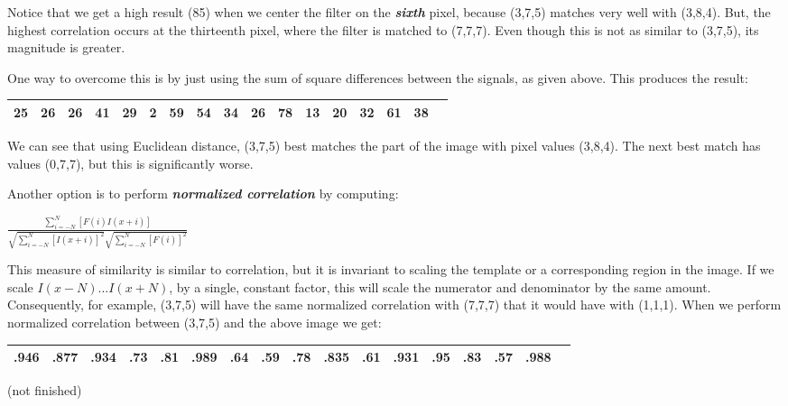 \documentclass{report}
\begin{document}
Notice that we get a high result (85) when we center the filter on the \textbf{\textit{sixth}} pixel, because (3,7,5) matches very well with (3,8,4). But, the highest correlation occurs at the thirteenth pixel, where the filter is matched to (7,7,7). Even though this is not as similar to (3,7,5), its magnitude is greater.

One way to overcome this is by just using the sum of square differences between the signals, as given above. This produces the result:

\begin{table}[ht]
\centering
\label{my-label-8}
\begin{tabular}{|l|l|l|l|l|l|l|l|l|l|l|l|l|l|l|l|l|}
\hline
25 & 26 & 26 & 41 & 29 & 2 & 59 & 54 & 34 & 26 & 78 & 13 & 20 & 32 & 61 & 38 \\ \hline
\end{tabular}
\end{table}

We can see that using Euclidean distance, (3,7,5) best matches the part of the image with pixel values (3,8,4). The next best match has values (0,7,7), but this is significantly worse.

Another option is to perform \textbf{\textit{normalized correlation}} by computing:\newline

\centerline{$\frac{\sum_{i=-N}^N [F(i)I(x+i)]}{\sqrt{\sum_{i=-N}^N [I(x+i)]^2} \sqrt{\sum_{i=-N}^N [F(i)]^2}}$}

This measure of similarity is similar to correlation, but it is invariant to scaling the template or a corresponding region in the image. If we scale $I(x-N)...I(x+N)$, by a single, constant factor, this will scale the numerator and denominator by the same amount. Consequently, for example, (3,7,5) will have the same normalized correlation with (7,7,7) that it would have with (1,1,1). When we perform normalized correlation between (3,7,5) and the above image we get:

\begin{table}[ht]
\centering
\label{my-label-9}
\begin{tabular}{|l|l|l|l|l|l|l|l|l|l|l|l|l|l|l|l|l|}
\hline
.946 & .877 & .934 & .73 & .81 & .989 & .64 & .59 & .78 & .835 & .61 & .931 & .95 & .83 & .57 & .988 \\ \hline
\end{tabular}
\end{table}

(not finished)
\end{document}
